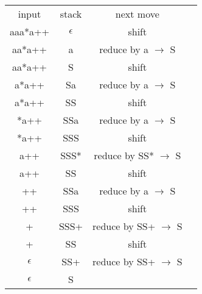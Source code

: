 \documentclass[letterpaper, 10pt,DIV=13]{scrartcl}
\numberwithin{equation}{section} %
\numberwithin{figure}{section} %
\numberwithin{table}{section} %
\begin{document}
\begin{center}
\begin{tabular}{ |c|c|c|c| } 
 \hline
 input & stack & next move\\ 
 aaa*a++ & $\epsilon$  & shift \\ 
 aa*a++ & a  & reduce by a $\to$ S \\ 
 aa*a++ & S  & shift \\ 
 a*a++ & Sa  & reduce by a $\to$ S \\ 
 a*a++ & SS  & shift \\ 
 *a++ & SSa  & reduce by a $\to$ S \\ 
 *a++ & SSS  & shift \\ 
 a++ & SSS* & reduce by SS* $\to$ S \\ 
 a++ & SS  & shift \\ 
 ++ & SSa  & reduce by a $\to$ S \\ 
 ++ & SSS  & shift \\ 
 + & SSS+  & reduce by SS+ $\to$ S \\ 
 + & SS  & shift \\ 
 $\epsilon$ & SS+  & reduce by SS+ $\to$ S \\  
 $\epsilon$ & S  &  \\ 
 \hline
\end{tabular}
\end{center}


 

\pagebreak
\end{document}
